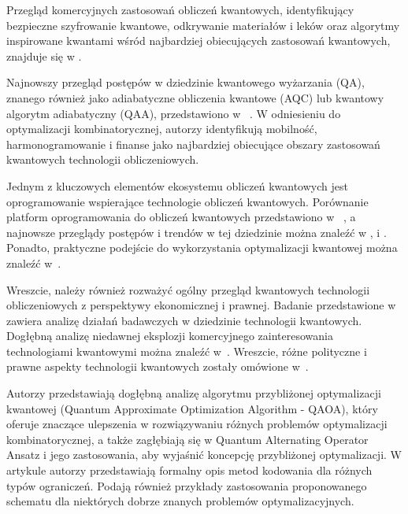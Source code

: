 \documentclass[a4paper,11pt]{article}
\begin{document}
Przegląd komercyjnych zastosowań obliczeń kwantowych, identyfikujący bezpieczne szyfrowanie kwantowe, odkrywanie materiałów i leków oraz algorytmy inspirowane kwantami wśród najbardziej obiecujących zastosowań kwantowych, znajduje się w \cite{bova2021commercial}. 

Najnowszy przegląd postępów w dziedzinie kwantowego wyżarzania (QA), znanego również jako adiabatyczne obliczenia kwantowe (AQC) lub kwantowy algorytm adiabatyczny (QAA), przedstawiono w ~\cite{yarkoni2022quantum}. W odniesieniu do optymalizacji kombinatorycznej, autorzy identyfikują mobilność, harmonogramowanie i finanse jako najbardziej obiecujące obszary zastosowań kwantowych technologii obliczeniowych.



Jednym z kluczowych elementów ekosystemu obliczeń kwantowych jest oprogramowanie wspierające technologie obliczeń kwantowych. Porównanie platform oprogramowania do obliczeń kwantowych przedstawiono w ~\cite{larose2019overview}, a najnowsze przeglądy postępów i trendów w tej dziedzinie można znaleźć w \cite{zhao2020quantum}, \cite{gill2021quantum} i \cite{miszczak2023symbolic}. Ponadto, praktyczne podejście do wykorzystania optymalizacji kwantowej można znaleźć w~\cite{combarro2023practical}.

Wreszcie, należy również rozważyć ogólny przegląd kwantowych technologii obliczeniowych z perspektywy ekonomicznej i prawnej.
Badanie przedstawione w \cite{seskir2021landscape} zawiera analizę działań badawczych w dziedzinie technologii kwantowych. Dogłębną analizę niedawnej eksplozji komercyjnego zainteresowania technologiami kwantowymi można znaleźć w~\cite{seskir2022landscape}. Wreszcie, różne polityczne i prawne aspekty technologii kwantowych zostały omówione w~\cite{hoofnagle2021law}. 





Autorzy \cite{choi2019tutorial} przedstawiają dogłębną analizę algorytmu przybliżonej optymalizacji kwantowej (Quantum Approximate Optimization Algorithm - QAOA), który oferuje znaczące ulepszenia w rozwiązywaniu różnych problemów optymalizacji kombinatorycznej, a także zagłębiają się w Quantum Alternating Operator Ansatz i jego zastosowania, aby wyjaśnić koncepcję przybliżonej optymalizacji. W artykule \cite{ruan2023quantum} autorzy przedstawiają formalny opis metod kodowania dla różnych typów ograniczeń. Podają również przykłady zastosowania proponowanego schematu dla niektórych dobrze znanych problemów optymalizacyjnych.
\end{document}
